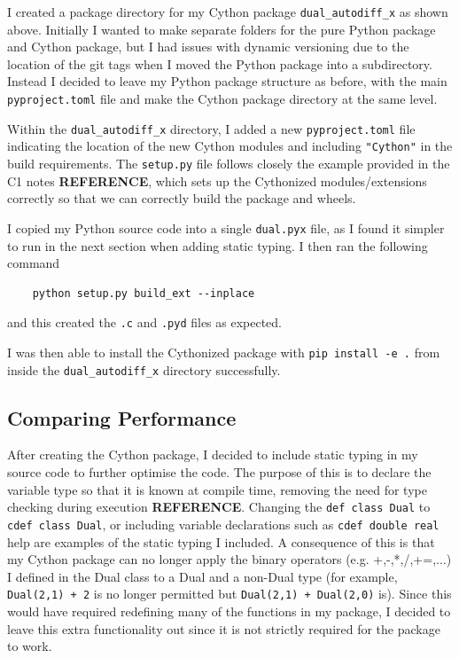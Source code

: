 \documentclass{article}
\begin{document}
I created a package directory for my Cython package \texttt{dual\_autodiff\_x} as shown above. Initially I wanted to make separate folders for the pure Python package and Cython package, but I had issues with dynamic versioning due to the location of the git tags when I moved the Python package into a subdirectory. Instead I decided to leave my Python package structure as before, with the main \texttt{pyproject.toml} file and make the Cython package directory at the same level. 

Within the \texttt{dual\_autodiff\_x} directory, I added a new \texttt{pyproject.toml} file indicating the location of the new Cython modules and including \texttt{"Cython"} in the build requirements. The \texttt{setup.py} file follows closely the example provided in the C1 notes \textbf{REFERENCE}, which sets up the Cythonized modules/extensions correctly so that we can correctly build the package and wheels.

I copied my Python source code into a single \texttt{dual.pyx} file, as I found it simpler to run in the next section when adding static typing. I then ran the following command
\begin{lstlisting}
    python setup.py build_ext --inplace
\end{lstlisting}
and this created the \texttt{.c} and \texttt{.pyd} files as expected. 

I was then able to install the Cythonized package with \texttt{pip install -e .} from inside the \texttt{dual\_autodiff\_x} directory successfully.

\subsection{ Comparing Performance }

After creating the Cython package, I decided to include static typing in my source code to further optimise the code. The purpose of this is to declare the variable type so that it is known at compile time, removing the need for type checking during execution \textbf{REFERENCE}. Changing the \texttt{def class Dual} to \texttt{cdef class Dual}, or including variable declarations such as \texttt{cdef double real} help are examples of the static typing I included. A consequence of this is that my Cython package can no longer apply the binary operators (e.g. +,-,*,/,+=,...) I defined in the Dual class to a Dual and a non-Dual type (for example, \texttt{Dual(2,1) + 2} is no longer permitted but \texttt{Dual(2,1) + Dual(2,0)} is). Since this would have required redefining many of the functions in my package, I decided to leave this extra functionality out since it is not strictly required for the package to work. 
\end{document}
